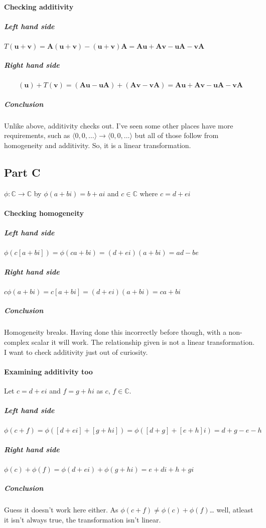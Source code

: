 \documentclass{article}
\begin{document}
            \paragraph{Checking additivity}
                \subparagraph{Left hand side}
                    $T(\mathbf{u}+\mathbf{v})=\mathbf{A}(\mathbf{u}+\mathbf{v})-(\mathbf{u}+\mathbf{v})\mathbf{A}=\mathbf{Au}+\mathbf{Av}-\mathbf{uA}-\mathbf{vA}$
                \subparagraph{Right hand side}
                    \[(\mathbf{u})+T(\mathbf{v})=(\mathbf{Au}-\mathbf{uA})+(\mathbf{Av}-\mathbf{vA})=\mathbf{Au}+\mathbf{Av}-\mathbf{uA}-\mathbf{vA}\]
                \subparagraph{Conclusion}
                    Unlike above, additivity checks out. I've seen some other places have more requirements,
                    such as $\langle 0, 0, \dots \rangle \rightarrow \langle 0, 0, \dots \rangle$
                    but all of those follow from homogeneity and additivity. So, it is a linear transformation.
        \subsection{Part C}
            $\phi: \mathbb{C}\rightarrow \mathbb{C}$
            by
            $\phi(a+bi)=b+ai$
            and
            $c \in{\mathbb{C}}$
            where
            $c=d+ei$
            \paragraph{Checking homogeneity}
                \subparagraph{Left hand side}
                    $\phi(c[a+bi])=\phi(ca+bi)=(d+ei)(a+bi)=ad-be$
                \subparagraph{Right hand side}
                    $c\phi(a+bi)=c[a+bi]=(d+ei)(a+bi)=ca+bi$
                \subparagraph{Conclusion}
                    Homogeneity breaks. Having done this incorrectly before though,
                    with a non-complex scalar it will work. The relationship given
                    is not a linear transformation. I want to check additivity just out of curiosity.
            \paragraph{Examining additivity too}
                Let $c=d+ei$ and $f=g+hi$ as $c,\,f\in{\mathbb{C}}$.
                \subparagraph{Left hand side}
                    $\phi(c+f)=\phi([d+ei]+[g+hi])=\phi([d+g]+[e+h]i)=d+g-e-h$
                \subparagraph{Right hand side}
                    $\phi(c)+\phi(f)=\phi(d+ei)+\phi(g+hi)=e+di+h+gi$
                \subparagraph{Conclusion}
                    Guess it doesn't work here either. As $\phi(c+f)\ne\phi(c)+\phi(f)$\dots
                    well, atleast it isn't always true, the transformation isn't linear.
\end{document}
